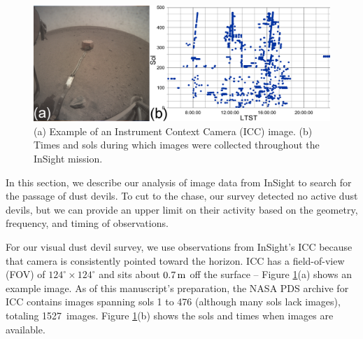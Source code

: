 \documentclass[linenumbers,trackchanges]{aastex63}
\newcommand{\numICCimages}{1527}
\begin{document}
\begin{figure}
    \centering
    \includegraphics[width=\textwidth]{figures/Example-Image_Insight-Combined-Analysis.png}
    \caption{(a) Example of an Instrument Context Camera (ICC) image. (b) Times and sols during which images were collected throughout the InSight mission.}
    \label{fig:Example-Image_Insight-Combined-Analysis}
\end{figure}

In this section, we describe our analysis of image data from InSight to search for the passage of dust devils. To cut to the chase, our survey detected no active dust devils, but we can provide an upper limit on their activity based on the geometry, frequency, and timing of observations.


For our visual dust devil survey, we use observations from InSight's ICC because that camera is consistently pointed toward the horizon. ICC has a field-of-view (FOV) of $124^\circ\times124^\circ$ and sits about $0.7\,{\rm m}$ off the surface \citep{2018SSRv..214..105M} -- Figure \ref{fig:Example-Image_Insight-Combined-Analysis}(a) shows an example image. As of this manuscript's preparation, the NASA PDS archive for ICC contains images spanning sols 1 to 476 (although many sols lack images), totaling \numICCimages\ images.  Figure \ref{fig:Example-Image_Insight-Combined-Analysis}(b) shows the sols and times when images are available. 

\end{document}
